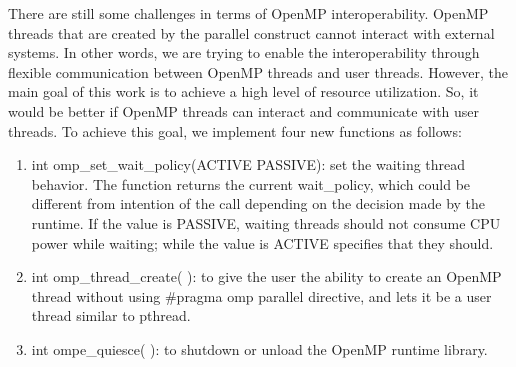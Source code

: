 There are still some challenges in terms of OpenMP interoperability. 
OpenMP threads that are created by the parallel construct cannot interact with external systems. 
In other words, we are trying to enable the interoperability through flexible communication between OpenMP threads and user threads. 
However, the main goal of this work is to achieve a high level of resource utilization. So, it would be better if OpenMP threads can interact and communicate with user threads. To achieve this goal, we implement four new functions as follows:
\begin{enumerate}
	\item int omp{\_}set{\_}wait{\_}policy(ACTIVE \textbar PASSIVE): 
	set the waiting thread behavior. The function returns the current wait{\_}policy, which could be different from intention of the call depending on the decision made by the runtime. If the value is PASSIVE, waiting threads should not consume CPU power while waiting; while the value is ACTIVE specifies that they should.
	\item int omp{\_}thread{\_}create( ): 
	to give the user the ability to create an OpenMP thread without using \#pragma omp parallel directive, and lets it be a user thread similar to pthread.
	\item int ompe{\_}quiesce( ): 
	to shutdown or unload the OpenMP runtime library.
\end{enumerate}
